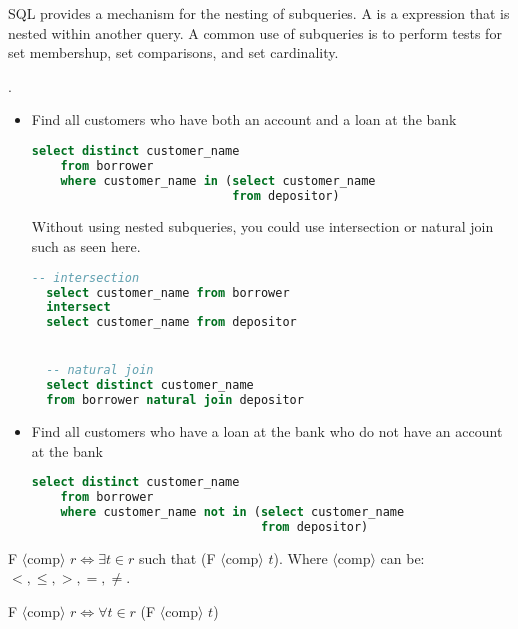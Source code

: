 \documentclass{article}
\begin{document}
SQL provides a mechanism for the nesting of subqueries. A  is a  expression that is nested within another query. A common use of subqueries is to perform tests for set membershup, set comparisons, and set cardinality. 

\begin{example} . \\
  \begin{itemize}
    \item Find all customers who have both an account and a loan at the bank
      \begin{lstlisting}[language=SQL]
  select distinct customer_name 
    from borrower 
    where customer_name in (select customer_name
                            from depositor)
      \end{lstlisting}
      Without using nested subqueries, you could use intersection or natural join such as seen here. 
      \begin{lstlisting}[language=SQL]
  -- intersection
  select customer_name from borrower 
  intersect 
  select customer_name from depositor


  -- natural join 
  select distinct customer_name 
  from borrower natural join depositor
      \end{lstlisting}

    \item Find all customers who have a loan at the bank who do not have an account at the bank
      \begin{lstlisting}[language=SQL]
  select distinct customer_name 
    from borrower 
    where customer_name not in (select customer_name 
                                from depositor)
      \end{lstlisting}
  \end{itemize}
\end{example}

\begin{definition}
  F $\langle$comp$\rangle$  $r \Leftrightarrow \exists t \in r$ such that (F $\langle$comp$\rangle$ $t$). Where $\langle$comp$\rangle$ can be: $<,\leq,>,=,\neq$. 
\end{definition}

\begin{definition}
  F $\langle$comp$\rangle$  $r \Leftrightarrow \forall t \in r$ (F $\langle$comp$\rangle$ $t$)
\end{definition}
\end{document}
